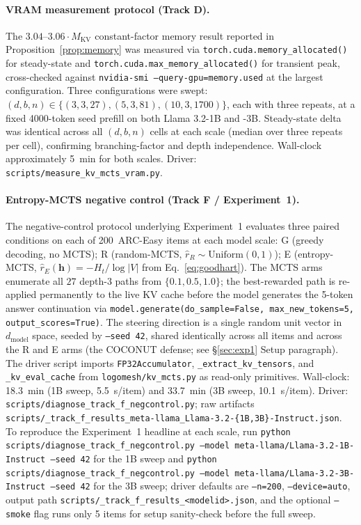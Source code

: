 \documentclass{article}
\begin{document}
\paragraph{VRAM measurement protocol (Track D).}
The $3.04$--$3.06 \cdot M_{\text{KV}}$ constant-factor memory result reported in Proposition~\ref{prop:memory} was measured via \texttt{torch.cuda.memory\_allocated()} for steady-state and \texttt{torch.cuda.max\_memory\_allocated()} for transient peak, cross-checked against \texttt{nvidia-smi --query-gpu=memory.used} at the largest configuration. Three configurations were swept: $(d, b, n) \in \{(3, 3, 27), (5, 3, 81), (10, 3, 1700)\}$, each with three repeats, at a fixed 4000-token seed prefill on both Llama 3.2-1B and -3B. Steady-state delta was identical across all $(d, b, n)$ cells at each scale (median over three repeats per cell), confirming branching-factor and depth independence. Wall-clock approximately 5~min for both scales. Driver: \texttt{scripts/measure\_kv\_mcts\_vram.py}.

\paragraph{Entropy-MCTS negative control (Track F / Experiment~1).}
The negative-control protocol underlying Experiment~1 evaluates three paired conditions on each of 200~ARC-Easy items at each model scale: G (greedy decoding, no MCTS); R (random-MCTS, $\hat{r}_R \sim \mathrm{Uniform}(0, 1)$); E (entropy-MCTS, $\hat{r}_E(\mathbf{h}) = -H_t / \log|V|$ from Eq.~\ref{eq:goodhart}). The MCTS arms enumerate all $27$ depth-$3$ paths from $\{0.1, 0.5, 1.0\}$; the best-rewarded path is re-applied permanently to the live KV cache before the model generates the 5-token answer continuation via \texttt{model.generate(do\_sample=False, max\_new\_tokens=5, output\_scores=True)}. The steering direction is a single random unit vector in $d_{\text{model}}$ space, seeded by \texttt{--seed 42}, shared identically across all items and across the R and E arms (the COCONUT defense; see §\ref{sec:exp1} Setup paragraph). The driver script imports \texttt{FP32Accumulator}, \texttt{\_extract\_kv\_tensors}, and \texttt{\_kv\_eval\_cache} from \texttt{logomesh/kv\_mcts.py} as read-only primitives. Wall-clock: 18.3~min (1B sweep, 5.5~s/item) and 33.7~min (3B sweep, 10.1~s/item). Driver: \texttt{scripts/diagnose\_track\_f\_negcontrol.py}; raw artifacts \texttt{scripts/\_track\_f\_results\_meta-llama\_Llama-3.2-\{1B,3B\}-Instruct.json}. To reproduce the Experiment~1 headline at each scale, run \texttt{python scripts/diagnose\_track\_f\_negcontrol.py --model meta-llama/Llama-3.2-1B-Instruct --seed 42} for the 1B sweep and \texttt{python scripts/diagnose\_track\_f\_negcontrol.py --model meta-llama/Llama-3.2-3B-Instruct --seed 42} for the 3B sweep; driver defaults are \texttt{--n=200}, \texttt{--device=auto}, output path \texttt{scripts/\_track\_f\_results\_<modelid>.json}, and the optional \texttt{--smoke} flag runs only 5 items for setup sanity-check before the full sweep.
\end{document}
